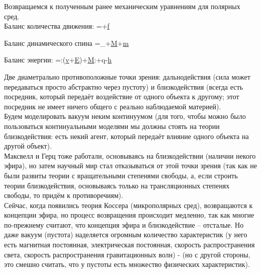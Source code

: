 \documentclass[main.tex]{subfiles}
\begin{document}
Возвращаемся к полученным ранее механическим уравнениям для полярных сред.\\

Баланс количества движения:
\beq\label{MotionEq}
\rho{}=\nabla\cdot\underline{\underline{\sigma}}+\rho\underline{f}
\eeq

Баланс динамического спина
\beq\label{SpinEq}
\rho{}=\underline{\underline{\sigma}}_{\times}+\nabla\cdot\underline{\underline{M}}+\rho\underline{m}
\eeq

Баланс энергии:
\beq\label{EnergyEq}
\rho{}=\underline{\underline{\sigma}}:\left(\nabla\underline{v}+\underline{\underline{E}}\times\underline{\omega}\right)+\underline{\underline{M}}:\nabla\underline{\omega}+\rho q-\nabla\cdot\underline{h}
\eeq

Две диаметрально противоположные точки зрения: дальнодействия (сила может передаваться просто абстрактно через пустоту) и близкодействия (всегда есть посредник, который передаёт воздействие от одного объекта к другому; этот посредник не имеет ничего общего с реально наблюдаемой материей).\\

Будем моделировать вакуум неким континуумом (для того, чтобы можно было пользоваться континуальными моделями мы должны стоять на теории близкодействия: есть некий агент, который передаёт влияние одного объекта на другой объект).\\

Максвелл и Герц тоже работали, основываясь на близкодействии (наличии некого эфира), но затем научный мир стал отказываться от этой точки зрения (так как не были развиты теории с вращательными степенями свободы, а, если строить теории близкодействия, основываясь только на трансляционных степенях свободы, то придём к противоречиям).\\

Сейчас, когда появились теория Коссера (микрополярных сред), возвращаются к концепции эфира, но процесс возвращения происходит медленно, так как многие по-прежнему считают, что концепция эфира и близкодействие -- отсталые. Но даже вакуум (пустота) наделяется огромным количество характеристик (у него есть магнитная постоянная, электрическая постоянная, скорость распространения света, скорость распространения гравитационных волн) - (но с другой стороны, это смешно считать, что у пустоты есть множество физических характеристик).
\end{document}
